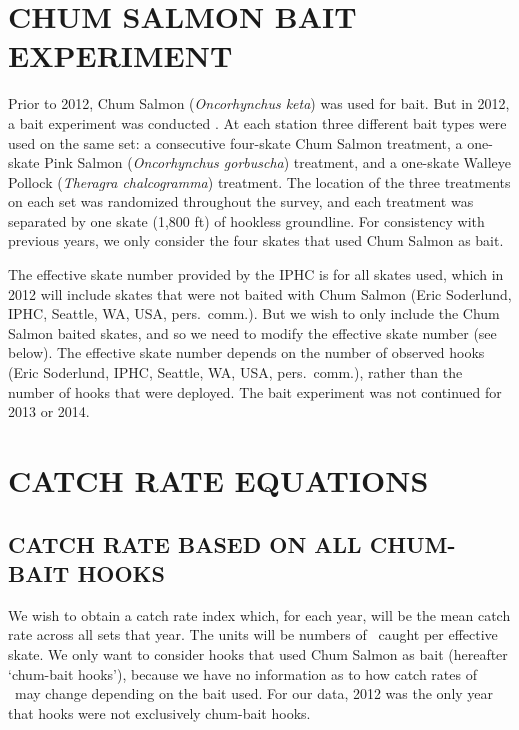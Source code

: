 \section{CHUM SALMON BAIT EXPERIMENT}\label{sec:chum}

Prior to 2012, Chum Salmon (\emph{Oncorhynchus keta}) was used for bait. But in
2012, a bait experiment was conducted \citep{hsdgr13}. At each station three
different bait types were used on the same set: a consecutive four-skate Chum
Salmon treatment, a one-skate Pink Salmon (\emph{Oncorhynchus gorbuscha})
treatment, and a one-skate Walleye Pollock (\emph{Theragra chalcogramma})
treatment. The location of the three treatments on each set was randomized
throughout the survey, and each treatment was separated by one skate (1,800 ft)
of hookless groundline. For consistency with previous years, we only consider
the four skates that used Chum Salmon as bait.

The effective skate number provided by the IPHC is for all skates used, which in
2012 will include skates that were not baited with Chum Salmon (Eric Soderlund,
IPHC, Seattle, WA, USA, pers.~comm.). But we wish to only include the Chum
Salmon baited skates, and so we need to modify the effective skate number (see
below). The effective skate number depends on the number of observed hooks (Eric
Soderlund, IPHC, Seattle, WA, USA, pers.~comm.), rather than the number of hooks
that were deployed. The bait experiment was not continued for 2013 or 2014.


\section{CATCH RATE EQUATIONS}\label{sec:notation}

\subsection{CATCH RATE BASED ON ALL CHUM-BAIT HOOKS}

We wish to obtain a catch rate index which, for each year, will be the mean
catch rate across all sets that year. The units will be numbers of
\spName~caught per effective skate. We only want to consider hooks that used
Chum Salmon as bait (hereafter `chum-bait hooks'), because we have no
information as to how catch rates of \spName~may change depending on the bait
used. For our data, 2012 was the only year that hooks were not exclusively
chum-bait hooks.

